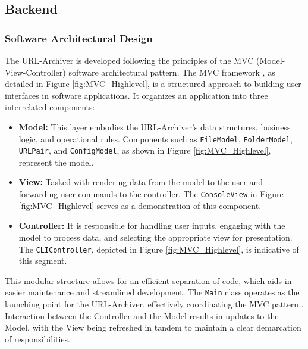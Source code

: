 \clearpage

\subsection{Backend}

\subsubsection{Software Architectural Design}
The URL-Archiver is developed following the principles of the MVC (Model-View-Controller)  software architectural pattern. The MVC framework , as detailed in Figure \ref{fig:MVC_Highlevel}, is a structured approach to building user interfaces in software applications. It organizes an application into three interrelated components:

\begin{itemize}
	\item \textbf{Model:} This layer embodies the URL-Archiver's data structures, business logic, and operational rules. Components such as \texttt{FileModel}, \texttt{FolderModel}, \texttt{URLPair}, and \texttt{ConfigModel}, as shown in Figure \ref{fig:MVC_Highlevel}, represent the model.
	\item \textbf{View:} Tasked with rendering data from the model to the user and forwarding user commands to the controller. The \texttt{ConsoleView} in Figure \ref{fig:MVC_Highlevel} serves as a demonstration of this component.
	\item \textbf{Controller:} It is responsible for handling user inputs, engaging with the model to process data, and selecting the appropriate view for presentation. The \texttt{CLIController}, depicted in Figure \ref{fig:MVC_Highlevel}, is indicative of this segment.
\end{itemize}

This modular structure allows for an efficient separation of code, which aids in easier maintenance and streamlined development. The \texttt{Main} class operates as the launching point for the URL-Archiver, effectively coordinating the MVC pattern . Interaction between the Controller and the Model results in updates to the Model, with the View being refreshed in tandem to maintain a clear demarcation of responsibilities.

